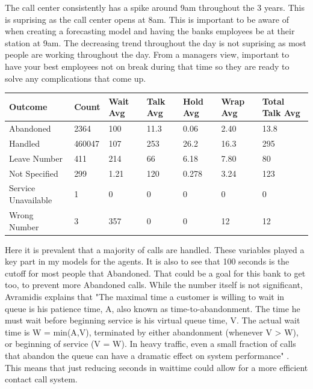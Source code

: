 \documentclass[12pt]{article}
\begin{document}
The call center consistently has a spike around 9am throughout the 3 years. This is suprising as the call center opens at 8am. This is important to be aware of when
creating a forecasting model and having the banks employees be at their station at 9am. The decreasing trend throughout the day is not suprising
as most people are working throughout the day. From a managers view, important to have your best employees not on break during that time so they are ready to solve 
any complications that come up. \citep{rafaeli2008impact}
\begin{table}[H]
  \resizebox{\textwidth}{!} {
  \begin{tabular}{ l | l | l | l | l | l | l}
    {\bf Outcome} & {\bf Count} & {\bf Wait Avg} & {\bf Talk Avg} & {\bf Hold Avg} & {\bf Wrap Avg} & {\bf Total Talk Avg} \\
  \hline
  Abandoned & 2364 & 100 & 11.3 & 0.06 & 2.40 & 13.8 \\
  \hline
  Handled & 460047 & 107 & 253 & 26.2 & 16.3 & 295\\
  \hline
  Leave Number & 411 & 214 & 66 & 6.18 & 7.80 & 80\\
  \hline
  Not Specified & 299 & 1.21 & 120 & 0.278 & 3.24 & 123\\
  \hline
  Service Unavailable & 1 & 0 & 0 & 0 & 0 & 0\\
  \hline
  Wrong Number & 3 & 357 & 0 & 0 & 12 & 12\\
  \end{tabular}
  }
  \end{table}
Here it is prevalent that a majority of calls are handled. These variables played a key part in my models for the agents. It is also to see that 
100 seconds is the cutoff for most people that Abandoned. That could be a goal for this bank to get too, to prevent more Abandoned calls. While 
the number itself is not significant, Avramidis explains that "The maximal time a customer is willing to wait in queue is his patience time, A, also known as time-to-abandonment. The
time he must wait before beginning service is his virtual queue time, V. The actual wait time is W = min(A,V), terminated by either abandonment (whenever V > W), or beginning of service (V = W).
In heavy traffic, even a small fraction of calls that abandon the queue can have a dramatic effect on system performance" \citep{avramidis2005modeling}. This means that just reducing seconds
in waittime could allow for a more efficient contact call system.
\end{document}

